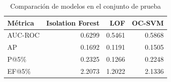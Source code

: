 \begin{table}[htbp]
\centering
\small
\caption{Comparación de modelos en el conjunto de prueba}
\label{tab:model-comparison}
\begin{tabular}{lrrr}
\toprule
Métrica & Isolation Forest & LOF & OC-SVM \\
\midrule
  AUC-ROC & 0.6299 & 0.5461 & 0.5868 \\
  AP & 0.1692 & 0.1191 & 0.1505 \\
  P@5\% & 0.2325 & 0.1266 & 0.2248 \\
  EF@5\% & 2.2073 & 1.2022 & 2.1336 \\
\bottomrule
\end{tabular}
\end{table}
